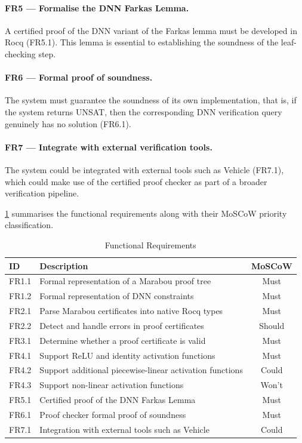 \paragraph*{FR5 --- Formalise the DNN Farkas Lemma.} A certified proof of the DNN variant of the Farkas lemma must be developed in Rocq (FR5.1). This lemma is essential to establishing the soundness of the leaf-checking step.

\paragraph*{FR6 --- Formal proof of soundness.} The system must guarantee the soundness of its own implementation, that is, if the system returns UNSAT, then the corresponding DNN verification query genuinely has no solution (FR6.1).

\paragraph*{FR7 --- Integrate with external verification tools.} The system could be integrated with external tools such as Vehicle (FR7.1), which could make use of the certified proof checker as part of a broader verification pipeline.


\cref{tab:fun-requirements-sub} summarises the functional requirements
along with their MoSCoW priority classification.

\begin{table}[h]
\centering
\begin{tabularx}{\textwidth}{l X c }
\toprule
\textbf{ID} & \textbf{Description} & \textbf{MoSCoW} \\
\midrule
FR1.1 & Formal representation of a Marabou proof tree & Must \\
FR1.2 & Formal representation of DNN constraints & Must \\
FR2.1 & Parse Marabou certificates into native Rocq types & Must \\
FR2.2 & Detect and handle errors in proof certificates & Should \\
FR3.1 & Determine whether a proof certificate is valid & Must \\
FR4.1 & Support ReLU and identity activation functions & Must \\
FR4.2 & Support additional piecewise-linear activation functions & Could \\
FR4.3 & Support non-linear activation functions & Won't \\
FR5.1 & Certified proof of the DNN Farkas Lemma & Must \\
FR6.1 & Proof checker formal proof of soundness & Must \\
FR7.1 & Integration with external tools such as Vehicle & Could \\
\bottomrule
\end{tabularx}
\caption{Functional Requirements}
\label{tab:fun-requirements-sub}
\end{table}

